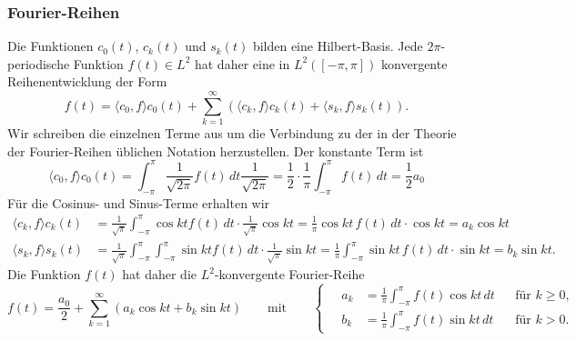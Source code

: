 %
%
\subsubsection{Fourier-Reihen}
Die Funktionen $c_0(t)$, $c_k(t)$ und $s_k(t)$ bilden eine Hilbert-Basis.
Jede $2\pi$-periodische Funktion $f(t)\in L^2$ hat daher eine in
$L^2([-\pi,\pi])$ konvergente Reihenentwicklung der Form
\[
f(t)
=
\langle c_0,f\rangle c_0(t)
+
\sum_{k=1}^\infty
(
\langle c_k,f\rangle c_k(t)
+
\langle s_k,f\rangle s_k(t)
).
\]
Wir schreiben die einzelnen Terme aus um die Verbindung zu der in der
Theorie der Fourier-Reihen üblichen Notation herzustellen.
Der konstante Term ist
\[
\langle c_0,f\rangle c_0(t)
=
\int_{-\pi}^\pi \frac{1}{\!\sqrt{2\pi}} f(t)\,dt \frac{1}{\!\sqrt{2\pi}}
=
\frac12 \cdot \frac1{\pi} \int_{-\pi}^\pi f(t)\,dt
=
\frac12 a_0
\]
Für die Cosinus- und Sinus-Terme erhalten wir 
\begin{align*}
\langle c_k,f\rangle c_k(t)
&=
\frac{1}{\!\sqrt{\pi}}
\int_{-\pi}^\pi \cos kt f(t)\,dt \cdot \frac{1}{\!\sqrt{\pi}}\cos kt
=
\frac{1}{\pi} \cos kt\,f(t)\,dt\cdot \cos kt
=
a_k \cos kt
\\
\langle s_k,f\rangle s_k(t)
&=
\frac{1}{\!\sqrt{\pi}}
\int_{-\pi}^\pi \int_{-\pi}^\pi \sin kt f(t)\,dt \cdot \frac{1}{\!\sqrt{\pi}}\sin kt
=
\frac{1}{\pi} \int_{-\pi}^\pi \sin kt\,f(t)\,dt\cdot \sin kt
=
b_k \sin kt.
\end{align*}
Die Funktion $f(t)$ hat daher die $L^2$-konvergente Fourier-Reihe
\[
f(t) = \frac{a_0}{2} + \sum_{k=1}^\infty (a_k \cos kt + b_k \sin kt)
\qquad\text{mit}\qquad
\left\{
\quad
\begin{aligned}
a_k
&=
\frac{1}{\pi}
\int_{-\pi}^\pi f(t) \cos kt\,dt
&&\text{für $k\ge 0$,}
\\
b_k
&=
\frac{1}{\pi}
\int_{-\pi}^\pi f(t) \sin kt\,dt
&&\text{für $k> 0$.}
\end{aligned}
\right.
\]

%
%
